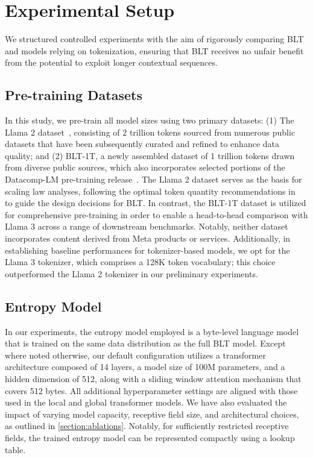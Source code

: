 \section{Experimental Setup}
\label{section:experiments}
We structured controlled experiments with the aim of rigorously comparing {\textsc BLT} and models relying on tokenization, ensuring that {\textsc BLT} receives no unfair benefit from the potential to exploit longer contextual sequences.

\subsection{Pre-training Datasets} In this study, we pre-train all model sizes using two primary datasets: (1) The Llama 2 dataset~\citep{touvron2023llama}, consisting of 2 trillion tokens sourced from numerous public datasets that have been subsequently curated and refined to enhance data quality; and (2) {\textsc BLT}-1T, a newly assembled dataset of 1 trillion tokens drawn from diverse public sources, which also incorporates selected portions of the Datacomp-LM pre-training release~\citep{li2024datacomp}. The Llama 2 dataset serves as the basis for scaling law analyses, following the optimal token quantity recommendations in~\cite{dubey2024llama} to guide the design decisions for {\textsc BLT}. In contrast, the {\textsc BLT}-1T dataset is utilized for comprehensive pre-training in order to enable a head-to-head comparison with Llama 3 across a range of downstream benchmarks. Notably, neither dataset incorporates content derived from Meta products or services. Additionally, in establishing baseline performances for tokenizer-based models, we opt for the Llama 3 tokenizer, which comprises a 128K token vocabulary; this choice outperformed the Llama 2 tokenizer in our preliminary experiments.

\subsection{Entropy Model} In our experiments, the entropy model employed is a byte-level language model that is trained on the same data distribution as the full {\textsc BLT} model. Except where noted otherwise, our default configuration utilizes a transformer architecture composed of 14 layers, a model size of 100M parameters, and a hidden dimension of 512, along with a sliding window attention mechanism that covers 512 bytes. All additional hyperparameter settings are aligned with those used in the local and global transformer models. We have also evaluated the impact of varying model capacity, receptive field size, and architectural choices, as outlined in \autoref{section:ablations}. Notably, for sufficiently restricted receptive fields, the trained entropy model can be represented compactly using a lookup table.

